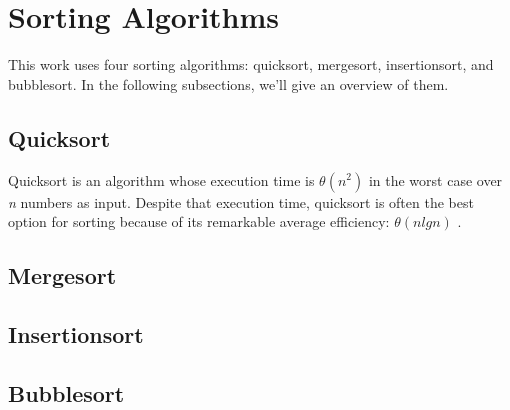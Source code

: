 \section{Sorting Algorithms}

This work uses four sorting algorithms: quicksort, mergesort, insertionsort, and bubblesort. In the following subsections, we'll give an overview of them.

\subsection{Quicksort}

Quicksort is an algorithm whose execution time is $\theta(n^2)$ in the worst case over \textit{n} numbers as input. Despite that execution time, quicksort is often the best option for sorting because of its remarkable average efficiency: $\theta(n lg n)$ \cite{Cormen2009}.

\subsection{Mergesort}

\subsection{Insertionsort}

\subsection{Bubblesort}